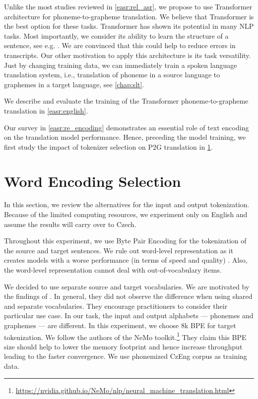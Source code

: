 Unlike the most studies reviewed in \cref{easr:rel_asr}, we propose to use Transformer architecture for phoneme-to-grapheme translation. We believe that Transformer is the best option for these tasks. Transformer has shown its potential in many NLP tasks. Most importantly, we consider its ability to learn the structure of a sentence, see e.g. \citet{machacek}. We are convinced that this could help to reduce errors in transcripts. Our other motivation to apply this architecture is its task versatility. Just by changing training data, we can immediately train a spoken language translation system, i.e., translation of phoneme in a source language to graphemes in a target language, see \cref{chap:slt}.

We describe and evaluate the training of the Transformer phoneme-to-grapheme translation in \cref{easr:english}.

Our survey in \cref{easr:re_encoding} demonstrates an essential role of text encoding on the translation model performance. Hence, preceding the model training, we first study the impact of tokenizer selection on P2G translation in \cref{easr:tokenizer}.


\section{Word Encoding Selection}
\label{easr:tokenizer}

In this section, we review the alternatives for the input and output tokenization. Because of the limited computing resources, we experiment only on English and assume the results will carry over to Czech. 

Throughout this experiment, we use Byte Pair Encoding for the tokenization of the source and target sentences. We rule out word-level representation as it creates models with a worse performance (in terms of speed and quality) . Also, the word-level representation cannot deal with out-of-vocabulary items.

We decided to use separate source and target vocabularies. We are motivated by the findings of . In general, they did not observe the difference when using shared and separate vocabularies. They encourage practitioners to consider their particular use case. In our task, the input and output alphabets --- phonemes and graphemes --- are different. In this experiment, we choose 8k BPE for target tokenization. We follow the authors of the NeMo toolkit.\footnote{\url{https://nvidia.github.io/NeMo/nlp/neural\_machine\_translation.html}} They claim this BPE size should help to lower the memory footprint and hence increase throughput leading to the faster convergence. We use phonemized CzEng corpus as training data.

